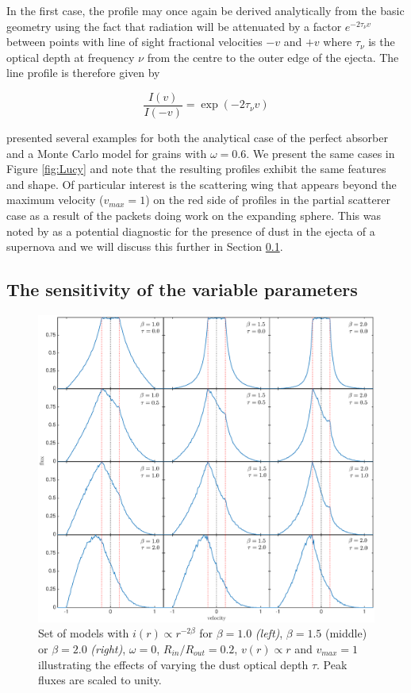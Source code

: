 \documentclass[useAMS,usenatbib,usegraphicx]{mnras}
\begin{document}
In the first case, the profile may once again be derived analytically from 
the basic geometry using the fact that radiation will be attenuated by a 
factor $e^{-2\tau_{\nu} v}$ between points with line of sight fractional velocities $-v$ and 
$+v$ where $\tau_{\nu}$ is the optical depth at frequency $\nu$ from the centre to the outer edge of the ejecta.  The line profile is therefore given by

\begin{equation}
\frac{I(v)}{I(-v)} = \exp(-2\tau_{\nu} v)  
\end{equation}

\citet{Lucy1989} presented several examples for both the analytical case of 
the perfect absorber and a Monte Carlo model for grains with $\omega 
=0.6$.  We present the same cases in Figure \ref{fig:Lucy} and note that 
the resulting profiles exhibit the same features and shape. Of particular 
interest is the scattering wing that appears beyond the maximum velocity 
($v_{max}=1$) on the red side of profiles in the partial 
scatterer case as a result of the packets doing work on the expanding sphere.  
This was noted by \citet{Lucy1989} as a potential diagnostic for the 
presence of dust in the ejecta of a supernova and we will discuss this 
further in Section \ref{ps}.


\subsection{The sensitivity of the variable parameters}
\label{ps}


\begin{figure}
\includegraphics[trim =80 10 6 15,clip=true,scale=0.515]{params/D/newDall} 
\caption{Set of models with $i(r) \propto r^{-2\beta}$ for $\beta=1.0$ \textit{(left)}, $\beta=1.5$ (middle) or $\beta=2.0$ \textit{(right)}, $\omega=0$, 
$R_{in}/R_{out}=0.2$, $v(r) \propto r$ and $v_{max}=1$ illustrating the effects of varying 
the dust optical depth $\tau$.  Peak fluxes are scaled to unity.}
\label{bt}
\end{figure}
\end{document}
